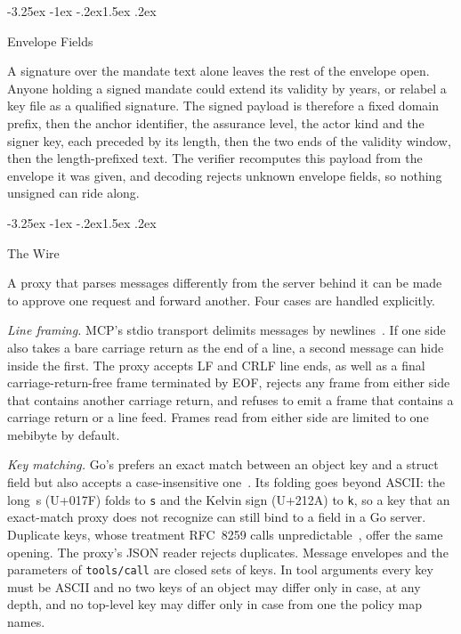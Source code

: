 \documentclass[10pt,twocolumn]{article}
\makeatletter
\theoremstyle{plain}
\theoremstyle{definition}
\renewcommand\subsection{\@startsection{subsection}{2}{\z@}%
  {-3.25ex \@plus -1ex \@minus -.2ex}{1.5ex \@plus .2ex}%
  {\normalfont\large\bfseries\raggedright}}
\makeatother
\begin{document}
\subsection{Envelope Fields}
\label{sec:attack-envelope}

A signature over the mandate text alone leaves the rest of the envelope open. Anyone holding a signed mandate could extend its validity by years, or relabel a key file as a qualified signature. The signed payload is therefore a fixed domain prefix, then the anchor identifier, the assurance level, the actor kind and the signer key, each preceded by its length, then the two ends of the validity window, then the length-prefixed text. The verifier recomputes this payload from the envelope it was given, and decoding rejects unknown envelope fields, so nothing unsigned can ride along.

\subsection{The Wire}
\label{sec:attack-wire}

A proxy that parses messages differently from the server behind it can be made to approve one request and forward another. Four cases are handled explicitly.

\emph{Line framing.} MCP's stdio transport delimits messages by newlines~\cite{mcp2025spec}. If one side also takes a bare carriage return as the end of a line, a second message can hide inside the first. The proxy accepts LF and CRLF line ends, as well as a final carriage-return-free frame terminated by EOF, rejects any frame from either side that contains another carriage return, and refuses to emit a frame that contains a carriage return or a line feed. Frames read from either side are limited to one mebibyte by default.

\emph{Key matching.} Go's  prefers an exact match between an object key and a struct field but also accepts a case-insensitive one~\cite{golang_json}. Its folding goes beyond ASCII: the long~s (U+017F) folds to \texttt{s} and the Kelvin sign (U+212A) to \texttt{k}, so a key that an exact-match proxy does not recognize can still bind to a field in a Go server. Duplicate keys, whose treatment RFC~8259 calls unpredictable~\cite{rfc8259}, offer the same opening. The proxy's JSON reader rejects duplicates. Message envelopes and the parameters of \texttt{tools/call} are closed sets of keys. In tool arguments every key must be ASCII and no two keys of an object may differ only in case, at any depth, and no top-level key may differ only in case from one the policy map names.
\end{document}
